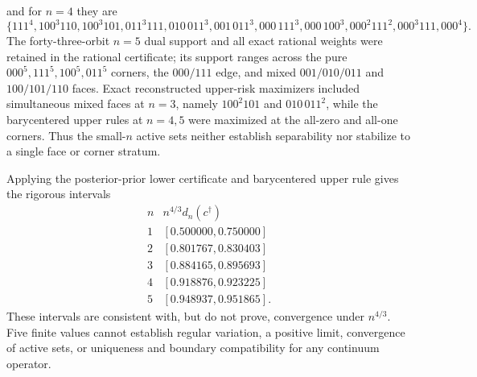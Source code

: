 and for \(n=4\) they are
\[
 \{111^4,100^3 110,100^3 101,011^3 111,010\,011^3,
 001\,011^3,000\,111^3,000\,100^3,000^2 111^2,000^3 111,000^4\}.
\]
The forty-three-orbit \(n=5\) dual support and all exact rational weights were retained in the rational certificate; its support ranges across the pure \(000^5,111^5,100^5,011^5\) corners, the \(000/111\) edge, and mixed \(001/010/011\) and \(100/101/110\) faces.  Exact reconstructed upper-risk maximizers included simultaneous mixed faces at \(n=3\), namely \(100^2 101\) and \(010\,011^2\), while the barycentered upper rules at \(n=4,5\) were maximized at the all-zero and all-one corners.  Thus the small-\(n\) active sets neither establish separability nor stabilize to a single face or corner stratum.

Applying the posterior-prior lower certificate and barycentered upper rule gives the rigorous intervals
\[
\begin{array}{c|c}
n&n^{4/3}d_n(c^\dagger)\\ \hline
1&[0.500000,0.750000]\\
2&[0.801767,0.830403]\\
3&[0.884165,0.895693]\\
4&[0.918876,0.923225]\\
5&[0.948937,0.951865].
\end{array}
\]
These intervals are consistent with, but do not prove, convergence under \(n^{4/3}\).  Five finite values cannot establish regular variation, a positive limit, convergence of active sets, or uniqueness and boundary compatibility for any continuum operator.